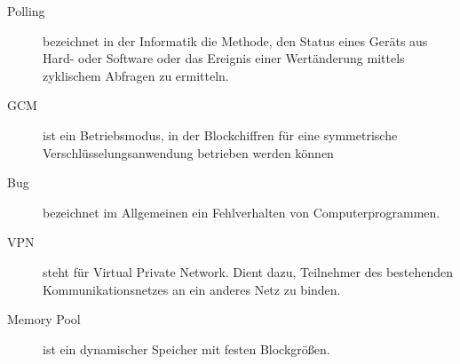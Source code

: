 \documentclass[a4paper, 11pt, ngerman, fleqn]{article}
\begin{document}
\begin{description}
	\item[Polling] bezeichnet in der Informatik die Methode, den Status eines Geräts aus Hard- oder Software oder das Ereignis einer Wertänderung mittels zyklischem Abfragen zu ermitteln.
	
	\item[GCM] ist ein Betriebsmodus, in der Blockchiffren für eine symmetrische Verschlüsselungsanwendung betrieben werden können
	
	\item[Bug] bezeichnet im Allgemeinen ein Fehlverhalten von Computerprogrammen.
	
	\item[VPN] steht für Virtual Private Network. Dient dazu, Teilnehmer des bestehenden Kommunikationsnetzes an ein anderes Netz zu binden.
	
	\item[Memory Pool] ist ein dynamischer Speicher mit festen Blockgrößen.                                     
	
	  
\end{description}



  
\end{document}
